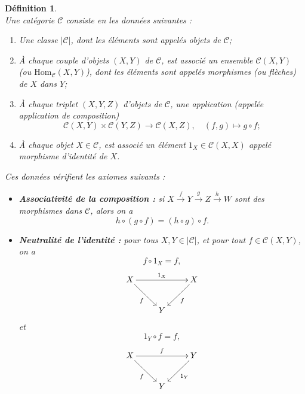 \documentclass[a4paper, 14pt]{report}
\newtheorem{definition}{Définition}[section]
\begin{document}
\begin{onehalfspace}
{			\begin{definition} \cite{maclane1971categories} \\
				Une catégorie $\mathcal{C}$ consiste en les données suivantes :
				\begin{enumerate} [label=\roman*)]
					\item Une classe $|\mathcal{C}|$, dont les éléments sont appelés objets de $\mathcal{C}$;
					\item À chaque couple d'objets $(X, Y)$ de $\mathcal{C}$, est associé un ensemble $\mathcal{C}(X, Y)$ (ou $\mathrm{Hom}_{\mathcal{C}}(X, Y)$), dont les éléments sont appelés morphismes (ou flèches) de $X$ dans $Y$;
					\item À chaque triplet $(X, Y, Z)$ d'objets de $\mathcal{C}$, une application (appelée application de composition)
					\[
					\mathcal{C}(X, Y) \times \mathcal{C}(Y, Z) \to \mathcal{C}(X, Z), \quad (f, g) \mapsto g \circ f;
					\]
					\item À chaque objet $X \in \mathcal{C}$, est associé un élément $1_X \in \mathcal{C}(X, X)$ appelé morphisme d'identité de $X$.
				\end{enumerate}
				Ces données vérifient les axiomes suivants :
				\begin{itemize}
					\item \textbf{Associativité de la composition :}
si $X \xrightarrow{f} Y \xrightarrow{g} Z \xrightarrow{h} W$ sont des morphismes dans $\mathcal{C}$, alors on a
					\[
					h \circ (g \circ f) = (h \circ g) \circ f.
					\]
					\item \textbf{Neutralité de l'identité :}
					pour tous $X, Y \in |\mathcal{C}|$, et pour tout $f \in \mathcal{C}(X, Y)$, on a
					\[
					f \circ 1_{X} = f,
					\]
					\[
					\xymatrix{
						X \ar[rr]^{1_{X}} \ar[dr]_{f} & & X \ar[dl]^{f} \\
						& Y &
					}
					\]
					et
					\[
					1_{Y} \circ f = f,
					\]
					\[
					\xymatrix{
						X \ar[rr]^{f} \ar[dr]_{f} & & Y \ar[dl]^{1_{Y}} \\
						& Y &
					}
					\]
				\end{itemize}
			\end{definition}
	
}
\end{onehalfspace}
\end{document}
